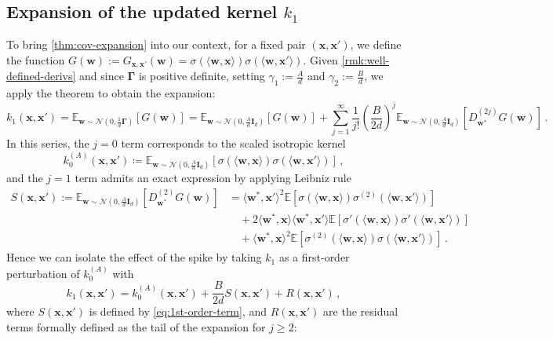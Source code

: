 \subsection{Expansion of the updated kernel $k_1$}
\label{sec:expansion}
To bring \cref{thm:cov-expansion} into our context, for a fixed pair $(\bm x, \bm x')$, we define the function $G(\bm w) := G_{\bm x, \bm x'}(\bm w) = \sigma(\langle \bm w, \bm x \rangle) \sigma(\langle \bm w, \bm x' \rangle)$. Given \cref{rmk:well-defined-derivs} and since $\bm \Gamma$ is positive definite, setting $\gamma_1 := \frac{A}{d}$ and $\gamma_2 := \frac{B}{d}$, we apply the theorem to obtain the expansion:
\[
    k_1(\bm x, \bm x') = \mathbb{E}_{\bm w \sim \mathcal N(0, \frac{1}{d}\bm \Gamma)}[ G(\bm{w})] = \mathbb{E}_{\bm w \sim \mathcal N(0, \frac{A}{d}\bm I_d)}[ G(\bm{w})]+ \sum_{j=1}^\infty \frac{1}{j!}\left(\frac{B}{2d}\right)^j \mathbb{E}_{\bm w \sim \mathcal N(0, \frac{A}{d}\bm I_d)}[ D_{\bm w^*}^{(2j)} G(\bm{w})]\, .
\]
In this series, the $j=0$ term corresponds to the scaled isotropic kernel 
\begin{equation*}
  k_0^{(A)} (\bm x, \bm x') \coloneqq \mathbb{E}_{\bm w \sim \mathcal N(0, \frac{A}{d}\bm I_d)}[ \sigma(\langle \bm w, \bm x \rangle) \sigma(\langle \bm w, \bm x' \rangle)] \,,  
\end{equation*}
and the $j=1$ term admits an exact expression by applying Leibniz rule
\begin{align}\label{eq:1st-order-term}
    S(\bm x, \bm x') := \mathbb{E}_{\bm w \sim \mathcal N(0, \frac{A}{d}\bm I_d)}[ D_{\bm w^*}^{(2)} G(\bm{w})] &= \langle \bm w^*, \bm{x}' \rangle^{2}\mathbb E[\sigma(\langle\bm w, \bm x\rangle)\sigma^{(2)}(\langle\bm w, \bm x'\rangle)] \nonumber \\
    &\quad + 2\langle \bm w^*, \bm{x} \rangle\langle \bm w^*, \bm{x}' \rangle\mathbb E[\sigma'(\langle\bm w, \bm x\rangle)\sigma'(\langle\bm w, \bm x'\rangle)] \\
    &\quad + \langle \bm w^*, \bm{x} \rangle^{2}\mathbb E[\sigma^{(2)}(\langle\bm w, \bm x\rangle)\sigma(\langle\bm w, \bm x'\rangle)] \nonumber\, .
\end{align}
Hence we can isolate the effect of the spike by taking $k_1$ as a first-order perturbation of $k_0^{(A)}$ with
\begin{equation}\label{eq:first-order-k1-exp}
    k_1(\bm x, \bm x') = k_0^{(A)}(\bm x, \bm x')+ \frac{B}{2d}S(\bm x, \bm x')+ R(\bm x, \bm x')\, ,    
\end{equation}
where $S(\bm x, \bm x')$ is defined by \cref{eq:1st-order-term}, and $R(\bm x, \bm x')$ are the residual terms formally defined as the tail of the expansion for $j \geq 2$:

